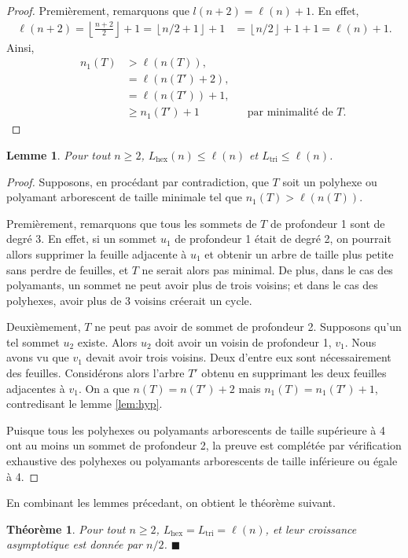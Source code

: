 \documentclass{article}
\newtheorem{thm}{Théorème}[section]
\newtheorem{lem}{Lemme}[section]
\theoremstyle{definition}
\newcommand{\Lhex}{L_{\text{hex}}}
\newcommand{\Ltri}{L_{\text{tri}}}
\begin{document}
\begin{proof}
   Premièrement, remarquons que $l(n + 2) = \ell(n) + 1$. En effet,
   \begin{align*}
      \ell(n+2) = \left\lfloor \frac{n+2}{2} \right\rfloor + 1 
             = \left\lfloor n/2 + 1 \right\rfloor + 1 
             &= \left\lfloor n/2 \right\rfloor + 1 + 1 = \ell(n) + 1.
   \end{align*}
   Ainsi,
   \begin{align*}
      && n_1(T) &> \ell(n(T)), && \\
      &&      &= \ell(n(T') + 2), && \\
      &&       &= \ell(n(T')) + 1, &&  \\
      &&       &\geq n_1(T') + 1 && \text{par minimalité de $T$.}
   \end{align*}
\end{proof}

\begin{lem}
   Pour tout $n \geq 2$, $\Lhex(n) \leq \ell(n)$ et $\Ltri \leq \ell(n)$.
\end{lem}

\begin{proof}
   Supposons, en procédant par contradiction, que $T$ soit un
   polyhexe ou polyamant arborescent de taille minimale 
   tel que $n_1(T) > \ell(n(T))$.

   Premièrement, remarquons que tous les sommets de $T$ de profondeur 
   1 sont de degré 3. En effet, si un sommet $u_1$ de profondeur 1 
   était de degré 2, on pourrait allors supprimer la feuille adjacente 
   à $u_1$ et obtenir un arbre de taille plus petite sans perdre 
   de feuilles, et $T$ ne serait alors pas minimal. De plus, dans 
   le cas des polyamants, un sommet ne peut avoir plus de trois
   voisins; et dans le cas des polyhexes, avoir plus de 3 voisins
   créerait un cycle.

   Deuxièmement, $T$ ne peut pas avoir de sommet de profondeur 2. 
   Supposons qu'un tel sommet $u_2$ existe. Alors $u_2$ doit avoir un 
   voisin de profondeur 1, $v_1$. Nous avons vu que $v_1$ devait avoir 
   trois voisins. Deux d'entre eux sont nécessairement des feuilles. 
   Considérons alors l'arbre $T'$ obtenu en supprimant les deux feuilles 
   adjacentes à $v_1$. On a que $n(T) = n(T') + 2$ mais $n_1(T) = 
   n_1(T') + 1$, contredisant le lemme \ref{lem:hyp}.

   Puisque tous les polyhexes ou polyamants arborescents de taille 
   supé\-rieure à 4 ont au moins un sommet de profondeur 2, la preuve est 
   complétée par vérification exhaustive des polyhexes ou 
   polyamants arborescents de taille inférieure ou égale à 4.

\end{proof}

En combinant les lemmes précedant, on obtient le théorème suivant.

\begin{thm}
   Pour tout $n \geq 2$, $\Lhex = \Ltri = \ell(n)$, et leur croissance
   asymptotique est donnée par $n/2$. \hfill $\blacksquare$
\end{thm}
\end{document}
